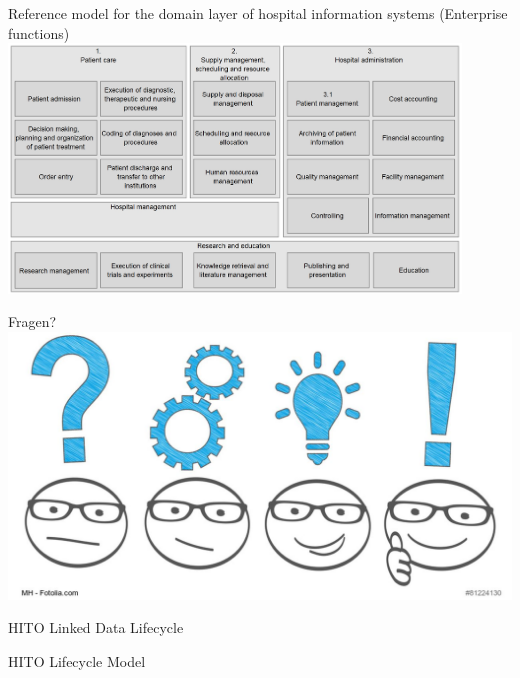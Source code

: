 \documentclass[aspectratio=1610,12pt]{beamer}
\begin{document}
\begin{frame}{Reference model for the domain layer of hospital information systems (Enterprise functions)}
  \centering
  \includegraphics[width=0.9\textwidth]{img/rmdl.png}
\end{frame}

\begin{frame}{Fragen?}
  \centering
  \vspace{-0.5cm}
  \includegraphics[width=\textwidth]{img/fragen.png}
\end{frame}


\begin{frame}{HITO Linked Data Lifecycle}
  \centering
  \vspace{-0.5cm}
\end{frame}

\begin{frame}{HITO Lifecycle Model}
 \centering
  \vspace{-0.5cm}
\end{frame}
\end{document}
